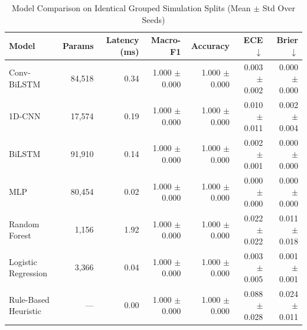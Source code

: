 \begin{table}[htbp]
\centering
\caption{Model Comparison on Identical Grouped Simulation Splits (Mean $\pm$ Std Over Seeds)}
\label{tab:model_comparison}
\begin{tabular}{lrrrrrr}
\toprule
Model & Params & Latency (ms) & Macro-F1 & Accuracy & ECE $\downarrow$ & Brier $\downarrow$ \\
\midrule
Conv-BiLSTM & 84,518 & 0.34 & 1.000 $\pm$ 0.000 & 1.000 $\pm$ 0.000 & 0.003 $\pm$ 0.002 & 0.000 $\pm$ 0.000 \\
1D-CNN & 17,574 & 0.19 & 1.000 $\pm$ 0.000 & 1.000 $\pm$ 0.000 & 0.010 $\pm$ 0.011 & 0.002 $\pm$ 0.004 \\
BiLSTM & 91,910 & 0.14 & 1.000 $\pm$ 0.000 & 1.000 $\pm$ 0.000 & 0.002 $\pm$ 0.001 & 0.000 $\pm$ 0.000 \\
MLP & 80,454 & 0.02 & 1.000 $\pm$ 0.000 & 1.000 $\pm$ 0.000 & 0.000 $\pm$ 0.000 & 0.000 $\pm$ 0.000 \\
Random Forest & 1,156 & 1.92 & 1.000 $\pm$ 0.000 & 1.000 $\pm$ 0.000 & 0.022 $\pm$ 0.022 & 0.011 $\pm$ 0.018 \\
Logistic Regression & 3,366 & 0.04 & 1.000 $\pm$ 0.000 & 1.000 $\pm$ 0.000 & 0.003 $\pm$ 0.005 & 0.001 $\pm$ 0.001 \\
Rule-Based Heuristic & --- & 0.00 & 1.000 $\pm$ 0.000 & 1.000 $\pm$ 0.000 & 0.088 $\pm$ 0.028 & 0.024 $\pm$ 0.011 \\
\bottomrule
\end{tabular}
\end{table}
